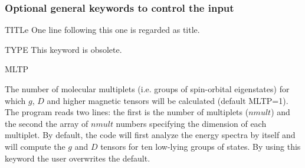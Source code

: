 \subsubsection{Optional general keywords to control the input}
\begin{keywordlist}



\item[TITLe]
One line following this one is regarded as title.




\item[TYPE]
This keyword is obsolete.




\item[MLTP]

The number of molecular multiplets (i.e. groups of spin-orbital eigenstates) for
which $g$, $D$ and higher magnetic tensors will be calculated (default MLTP=1).
The program reads two lines: the first is the number of multiplets ($nmult$) and
the second the array of $nmult$ numbers specifying the dimension of each multiplet.
By default, the code will first analyze the energy spectra by itself and will
compute the $g$ and $D$ tensors for ten low-lying groups of states. By using this
keyword the user overwrites the default.


\end{keywordlist}
